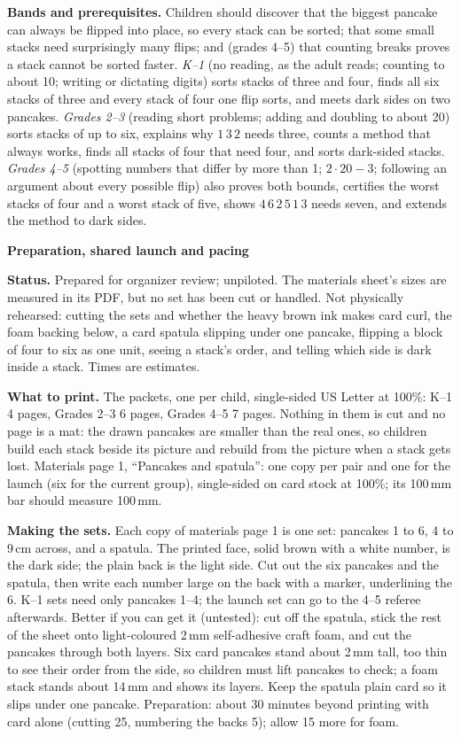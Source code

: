 \documentclass[11pt]{article}
\newcommand{\head}[1]{\par\textbf{\large #1}\par}
\begin{document}
\textbf{Bands and prerequisites.} Children should discover that the biggest pancake can always be flipped into place, so every stack can be sorted; that some small stacks need surprisingly many flips; and (grades 4--5) that counting breaks proves a stack cannot be sorted faster. \emph{K--1} (no reading, as the adult reads; counting to about 10; writing or dictating digits) sorts stacks of three and four, finds all six stacks of three and every stack of four one flip sorts, and meets dark sides on two pancakes. \emph{Grades 2--3} (reading short problems; adding and doubling to about 20) sorts stacks of up to six, explains why $1\,3\,2$ needs three, counts a method that always works, finds all stacks of four that need four, and sorts dark-sided stacks. \emph{Grades 4--5} (spotting numbers that differ by more than 1; $2\cdot20-3$; following an argument about every possible flip) also proves both bounds, certifies the worst stacks of four and a worst stack of five, shows $4\,6\,2\,5\,1\,3$ needs seven, and extends the method to dark sides.
\newpage
\head{Preparation, shared launch and pacing}
\textbf{Status.} Prepared for organizer review; unpiloted. The materials sheet's sizes are measured in its PDF, but no set has been cut or handled. Not physically rehearsed: cutting the sets and whether the heavy brown ink makes card curl, the foam backing below, a card spatula slipping under one pancake, flipping a block of four to six as one unit, seeing a stack's order, and telling which side is dark inside a stack. Times are estimates.

\textbf{What to print.} The packets, one per child, single-sided US Letter at 100\%: K--1 4 pages, Grades 2--3 6 pages, Grades 4--5 7 pages. Nothing in them is cut and no page is a mat: the drawn pancakes are smaller than the real ones, so children build each stack beside its picture and rebuild from the picture when a stack gets lost. Materials page 1, ``Pancakes and spatula'': one copy per pair and one for the launch (six for the current group), single-sided on card stock at 100\%; its 100\,mm bar should measure 100\,mm.

\textbf{Making the sets.} Each copy of materials page 1 is one set: pancakes 1 to 6, 4 to 9\,cm across, and a spatula. The printed face, solid brown with a white number, is the dark side; the plain back is the light side. Cut out the six pancakes and the spatula, then write each number large on the back with a marker, underlining the 6. K--1 sets need only pancakes 1--4; the launch set can go to the 4--5 referee afterwards. Better if you can get it (untested): cut off the spatula, stick the rest of the sheet onto light-coloured 2\,mm self-adhesive craft foam, and cut the pancakes through both layers. Six card pancakes stand about 2\,mm tall, too thin to see their order from the side, so children must lift pancakes to check; a foam stack stands about 14\,mm and shows its layers. Keep the spatula plain card so it slips under one pancake. Preparation: about 30 minutes beyond printing with card alone (cutting 25, numbering the backs 5); allow 15 more for foam.
\end{document}
